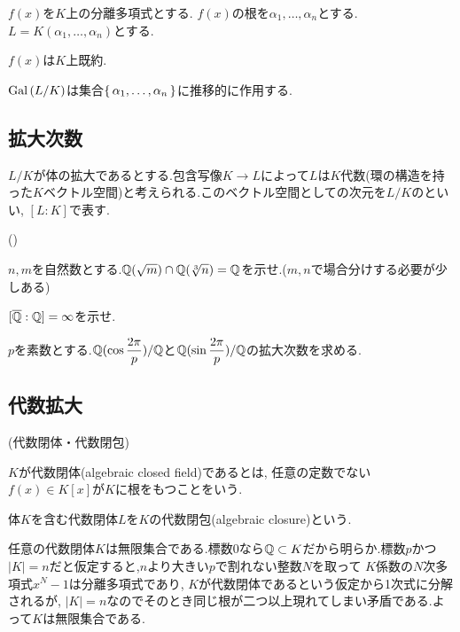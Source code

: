 \begin{prop}
$f(x)$を$K$上の分離多項式とする. $f(x)$の根を$\alpha_1,\dots, \alpha_n$とする. $L=K(\alpha_1,\dots, \alpha_n)$とする.
\ben
\item $f(x)$は$K$上既約.
\item $\operatorname{Gal}{(L/K)}$は集合$\set{\alpha_1,\dots,\alpha_n}$に推移的に作用する.
\een
\end{prop}




\subsection{拡大次数}
$L/K$が体の拡大であるとする.包含写像$K\to L$によって$L$は$K$代数(環の構造を持った$K$ベクトル空間)と考えられる.このベクトル空間としての次元を$L/K$のといい, $[L:K]$で表す.
\begin{prop} ()
\ben
\item \bolm{[L:K] = [L:M][M:K]}
\een
\end{prop}

\begin{prac}
$n,m$を自然数とする.$\mathbb{Q}(\sqrt{m})\cap \mathbb{Q}(\sqrt[3]{n}) = \mathbb{Q}$を示せ.($m,n$で場合分けする必要が少しある)
\end{prac}
\begin{prac}
$[\overline{\mathbb{Q}}:\mathbb{Q}] = \infty$を示せ.
\end{prac}

\begin{eg}
$p$を素数とする.$\mathbb{Q}(\cos{\dfrac{2\pi}{p}})/\mathbb{Q}$と$\mathbb{Q}(\sin{\dfrac{2\pi}{p}})/\mathbb{Q}$の拡大次数を求める.
\end{eg}

\subsection{代数拡大}
\begin{defn} (代数閉体・代数閉包)\\
\ben
\item $K$が代数閉体(algebraic closed field)であるとは, 任意の定数でない$f(x) \in K[x]$が$K$に根をもつことをいう.
\item 体$K$を含む代数閉体$L$を$K$の代数閉包(algebraic closure)という.
\een
\end{defn}

\begin{rem}
任意の代数閉体$K$は無限集合である.標数$0$なら$\mathbb{Q}\subset K$だから明らか.標数$p$かつ$|K| = n$だと仮定すると,$n$より大きい$p$で割れない整数$N$を取って $K$係数の$N$次多項式$x^{N} - 1$は分離多項式であり, $K$が代数閉体であるという仮定から1次式に分解されるが, $|K|=n$なのでそのとき同じ根が二つ以上現れてしまい矛盾である.よって$K$は無限集合である.
\end{rem}

